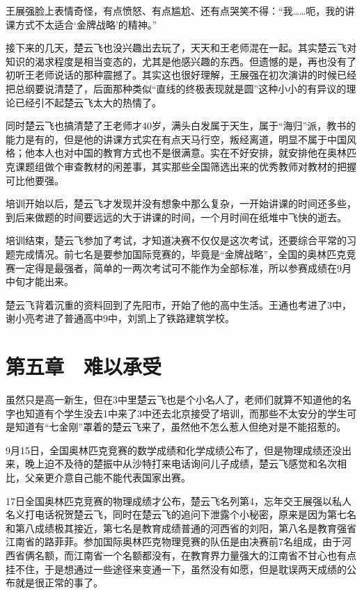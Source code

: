 王展强脸上表情奇怪，有点愤怒、有点尴尬、还有点哭笑不得：“我……呃，我的讲课方式不太适合‘金牌战略’的精神。”

接下来的几天，楚云飞也没兴趣出去玩了，天天和王老师混在一起。其实楚云飞对知识的渴求程度是相当变态的，尤其是他感兴趣的东西。但遗憾的是，再也没有了初听王老师说话的那种震撼了。其实这也很好理解，王展强在初次演讲的时候已经把总纲要说清楚了，后面那种类似“直线的终极表现就是圆”这种小小的有异议的理论已经引不起楚云飞太大的热情了。

同时楚云飞也搞清楚了王老师才40岁，满头白发属于天生，属于“海归”派，教书的能力是有的，但是他的讲课方式实在有点天马行空，叛经离道，明显不属于中国风格；他本人也对中国的教育方式也不是很满意。实在不好安排，就安排他在奥林匹克课题组做个审查教材的闲差事，其实那些全国筛选出来的优秀教师对教材的把握可比他要强。

培训开始以后，楚云飞才发现并没有想象中那么复杂，一开始讲课的时间还多些，到后来做题的时间要远远的大于讲课的时间，一个月时间在纸堆中飞快的逝去。

培训结束，楚云飞参加了考试，才知道决赛不仅仅是这次考试，还要综合平常的习题完成情况。前七名是要参加国际竞赛的，毕竟是“金牌战略”，全国的奥林匹克竞赛一定得是最强者，简单的一两次考试可不能作为全部标准，所以参赛成绩在9月中旬才能出来。

楚云飞背着沉重的资料回到了先阳市，开始了他的高中生活。王通也考进了3中，谢小亮考进了普通高中9中，刘凯上了铁路建筑学校。

\section{第五章　难以承受}

虽然只是高一新生，但在3中里楚云飞也是个小名人了，老师们就算不知道他的名字也知道有个学生没去1中来了3中还去北京接受了培训，而那些不太安分的学生可是知道有“七金刚”罩着的楚云飞来了，虽然他不怎么惹人但绝对是不能招惹的。

9月15日，全国奥林匹克竞赛的数学成绩和化学成绩公布了，但是物理成绩还没出来，晚上迫不及待的楚振中从沙特打来电话询问儿子成绩，楚云飞感觉和名次相比，父亲更介意自己能不能代表国家出赛。

17日全国奥林匹克竞赛的物理成绩才公布，楚云飞名列第4，忘年交王展强以私人名义打电话祝贺楚云飞，同时在楚云飞的追问下泄露个小秘密，原来是因为第七名和第八成绩极其接近，第七名是教育成绩普通的河西省的刘阳，第八名是教育强省江南省的路菲菲。参加国际奥林匹克物理竞赛的队伍是由决赛前7名组成，由于河西省俩名额，而江南省一个名额都没有，在教育界力量强大的江南省不甘心也有点挂不住，于是想通过一些途径来变通一下，虽然没有如愿，但是耽误两天成绩的公布就是很正常的事了。


